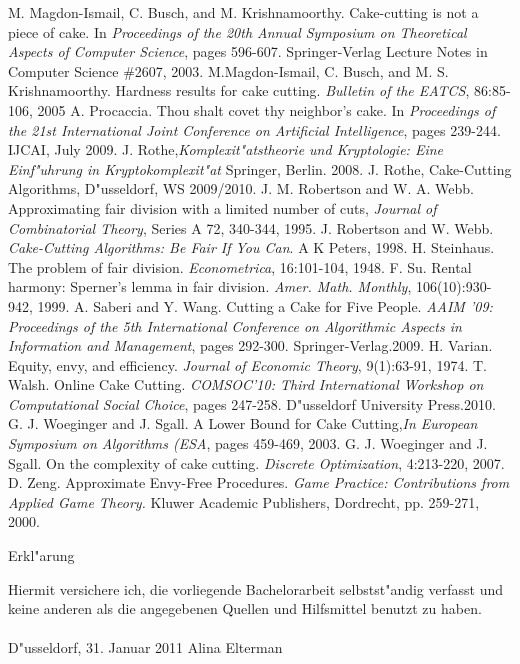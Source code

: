 \documentclass[11pt, a4paper, twoside]{article}
\numberwithin{equation}{section}
\begin{document}
\begin{thebibliography}{9}
 M. Magdon-Ismail, C. Busch, and M. Krishnamoorthy. Cake-cutting is not a piece of cake. In \emph{Proceedings of the 20th Annual Symposium on Theoretical Aspects of Computer Science}, pages 596-607. Springer-Verlag Lecture Notes in Computer Science \#2607, 2003.
 M.Magdon-Ismail, C. Busch, and
M. S. Krishnamoorthy. Hardness results for cake cutting. \emph{Bulletin of the EATCS}, 86:85-106, 2005
 A. Procaccia. Thou shalt covet thy neighbor's cake. In \emph{Proceedings of the 21st International Joint Conference on Artificial Intelligence}, pages 239-244. IJCAI, July 2009.
 J. Rothe,\emph{Komplexit"atstheorie und Kryptologie: Eine Einf"uhrung in Kryptokomplexit"at} Springer, Berlin. 2008.
 J. Rothe, Cake-Cutting Algorithms, D"usseldorf, WS 2009/2010.
 J. M. Robertson and W. A. Webb. Approximating fair division with a limited number of cuts, \emph{Journal of Combinatorial Theory}, Series A 72, 340-344, 1995.
 J. Robertson and W. Webb. \emph{Cake-Cutting Algorithms: Be Fair If You Can}. A K Peters, 1998.
 H. Steinhaus. The problem of fair division. \emph{Econometrica}, 16:101-104, 1948.
 F. Su. Rental harmony: Sperner's lemma in fair division. \emph{Amer. Math. Monthly}, 106(10):930-942, 1999.
 A. Saberi and Y. Wang. Cutting a Cake for Five People. \emph{AAIM '09: Proceedings of the 5th International Conference on Algorithmic Aspects in Information and Management}, pages 292-300. Springer-Verlag.2009.
 H. Varian. Equity, envy, and efficiency. \emph{Journal of Economic Theory}, 9(1):63-91, 1974.
 T. Walsh. Online Cake Cutting. \emph{COMSOC'10: Third International Workshop on Computational Social Choice}, pages 247-258. D"usseldorf University Press.2010.
 G. J. Woeginger and J. Sgall. A Lower Bound for Cake Cutting,\emph{In European Symposium on Algorithms (ESA}, pages 459-469, 2003.
 G. J. Woeginger and J. Sgall.
On the complexity of cake cutting. \emph{Discrete Optimization},
4:213-220, 2007.
 D. Zeng. Approximate Envy-Free Procedures. \emph{Game Practice: Contributions from Applied Game Theory.} Kluwer Academic Publishers, Dordrecht, pp. 259-271, 2000.
\end{thebibliography}
\newpage
\thispagestyle{empty}
\begin{center}
\Huge Erkl"arung
\end{center}
\vspace{1cm}
\noindent Hiermit versichere ich, die vorliegende Bachelorarbeit selbstst"andig verfasst und keine anderen als die angegebenen Quellen und Hilfsmittel benutzt zu haben.\\
\vspace{3cm}\\
D"usseldorf, 31. Januar 2011 \hfill Alina Elterman
\end{document}
